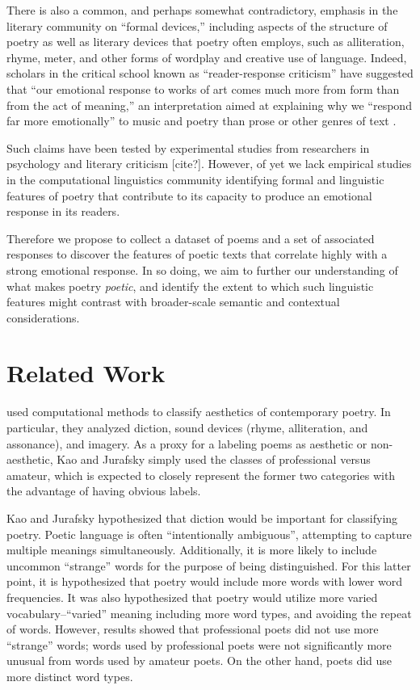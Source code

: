 \documentclass[11pt]{article}
\begin{document}
There is also a common, and perhaps somewhat contradictory, emphasis in the literary community on ``formal devices,'' including aspects of the structure of poetry as well as literary devices that poetry often employs, such as alliteration, rhyme, meter, and other forms of wordplay and creative use of language. Indeed, scholars in the critical school known as ``reader-response criticism'' have suggested that ``our emotional response to works of art comes much more from form than from the act of meaning,'' an interpretation aimed at explaining why we ``respond far more emotionally'' to music and poetry than prose or other genres of text \cite{holland1989dynamics}.

Such claims have been tested by experimental studies from researchers in psychology and literary criticism [cite?]. However, of yet we lack empirical studies in the computational linguistics community identifying formal and linguistic features of poetry that contribute to its capacity to produce an emotional response in its readers.

Therefore we propose to collect a dataset of poems and a set of associated responses to discover the features of poetic texts that correlate highly with a strong emotional response. In so doing, we aim to further our understanding of what makes poetry \emph{poetic}, and identify the extent to which such linguistic features might contrast with broader-scale semantic and contextual considerations.



\section{Related Work}


 used computational methods to classify aesthetics of contemporary poetry. In particular, they analyzed diction, sound devices (rhyme, alliteration, and assonance), and imagery. As a proxy for a labeling poems as aesthetic or non-aesthetic, Kao and Jurafsky simply used the classes of professional versus amateur, which is expected to closely represent the former two categories with the advantage of having obvious labels.

Kao and Jurafsky hypothesized that diction would be important for classifying poetry. Poetic language is often ``intentionally ambiguous'', attempting to capture multiple meanings simultaneously. Additionally, it is more likely to include uncommon ``strange'' words for the purpose of being distinguished. For this latter point, it is hypothesized that poetry would include more words with lower word frequencies. It was also hypothesized that poetry would utilize more varied vocabulary--``varied'' meaning including more word types, and avoiding the repeat of words. However, results showed that professional poets did not use more ``strange'' words; words used by professional poets were not significantly more unusual from words used by amateur poets. On the other hand, poets did use more distinct word types.
\end{document}
